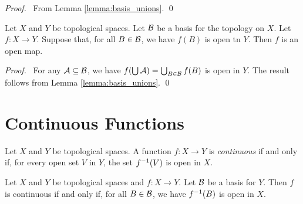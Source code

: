 \begin{proof}
    \pf\ From Lemma \ref{lemma:basis_unions}. \qed
\end{proof}

\begin{proposition}
    \label{proposition:open_map_basis}
    Let $X$ and $Y$ be topological spaces. Let $\mathcal{B}$ be a basis for the topology on $X$.
    Let $f : X \rightarrow Y$. Suppose that, for all $B \in \mathcal{B}$, we have $f(B)$
    is open tn $Y$. Then $f$ is an open map.
\end{proposition}

\begin{proof}
    \pf\ For any $\mathcal{A} \subseteq \mathcal{B}$, we have $f(\bigcup \mathcal{A}) = \bigcup_{B \in \mathcal{B}} f(B)$
    is open in $Y$. The result follows from Lemma \ref{lemma:basis_unions}. \qed
\end{proof}

\section{Continuous Functions}

\begin{definition}[Continuous]
    Let $X$ and $Y$ be topological spaces. A function $f : X \rightarrow Y$ is \emph{continuous} if and only
    if, for every open set $V$ in $Y$, the set ${f}^{-1}(V)$ is open in $X$.
\end{definition}

\begin{proposition}
    \label{proposition:continuous_basis}
    Let $X$ and $Y$ be topological spaces and $f : X \rightarrow Y$. Let $\mathcal{B}$ be a basis for $Y$. Then $f$
    is continuous if and only if, for all $B \in \mathcal{B}$, we have ${f}^{-1}(B)$ is open in $X$.
\end{proposition}

